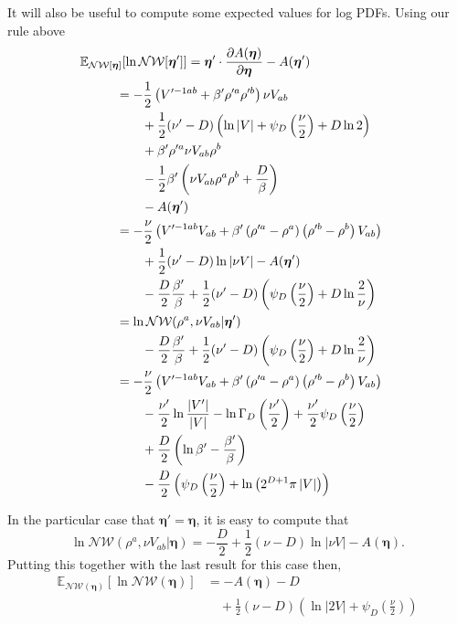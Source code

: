 \documentclass[aps,showpacs,twocolumn,prd,superscriptaddress,nofootinbib]{revtex4}
\newcommand{\be}{\begin{equation}}
\newcommand{\ee}{\end{equation}}
\newcommand{\nn}{\nonumber}
\newcommand{\E}[1]{{\mathbb E}_{#1}\!}
\begin{document}
It will also be useful to compute some expected values for log PDFs. Using our rule above
\begin{align}
  \E{\mathcal {NW}[\bm\eta]}\left[\ln\mathcal{NW}[\bm\eta']\right]
  \mkern-100mu &\mkern100mu =\bm\eta' \cdot \frac{\partial A(\bm\eta)}{\partial\bm\eta} -A({\bm\eta'})&\nn\\
  \qquad&=
  -\frac12\left(V'^{-1ab}+\beta'\rho'^a\rho'^b\right){\nu}V_{ab}\nn\\
  &\qquad+\frac12(\nu'-D)\left(\ln\left|V\right|+\psi_D\left(\frac\nu2\right)+D\ln2\right)\nn\\
  &\qquad+\beta'\rho'^a\nu V_{ab}\rho^b\nn\\
  &\qquad-\frac12\beta'\left(\nu V_{ab}\rho^a\rho^b+\frac D\beta\right)\nn\\
  &\qquad-A({\bm\eta'})\nn\\
  &=
  -\frac\nu2\left(V'^{-1ab}V_{ab}+\beta'\left(\rho'^a-\rho^a\right)\left(\rho'^b-\rho^b\right)V_{ab}\right)\nn\\
  &\qquad+\frac12(\nu'-D)\ln\left|\nu V\right|-A({\bm\eta'})\nn\\
  &\qquad-\frac D2\frac{\beta'}\beta+\frac12(\nu'-D)\left(\psi_D\left(\frac\nu2\right)+D\ln\frac2\nu\right)\nn\\
  &=\ln\mathcal {NW}(\rho^a,\nu V_{ab}|\bm\eta')\nn\\
  &\qquad-\frac D2\frac{\beta'}\beta+\frac12(\nu'-D)\left(\psi_D\left(\frac\nu2\right)+D\ln\frac2\nu\right)\label{eq:ElnNW-compact}\\
  &=
  -\frac\nu2\left(V'^{-1ab}V_{ab}+\beta'\left(\rho'^a-\rho^a\right)\left(\rho'^b-\rho^b\right)V_{ab}\right)\nn\\
  &\qquad-\frac{\nu'}2\ln\frac{|V'|}{|V|}-\ln\Gamma_D\left(\frac{\nu'}2\right)+\frac{\nu'}2\psi_D\left(\frac\nu2\right)\nn\\
  &\qquad+\frac D2\left(\ln\beta'-\frac{\beta'}\beta\right)\nn\\
  &\qquad- \frac D2\left(\psi_D\left(\frac\nu2\right)+\ln\left(2^{D+1}\pi\left|V\right|\right)\right)\label{eq:ElnNW-expanded}
\end{align}

In the particular case that $\bm\eta'=\bm\eta$, it is easy to compute that
\be
\ln\mathcal {NW}\left(\rho^a,\nu V_{ab}|\bm\eta\right)=-\frac D2+\frac12(\nu-D)\ln\left|\nu V\right|-A({\bm\eta}).\nn
\ee
Putting this together with the last result for this case then,
\begin{align}
  \E{\mathcal {NW}\left(\bm\eta\right)}\left[\ln\mathcal{NW}\left(\bm\eta\right)\right]
  &=
  -A({\bm\eta})-D\nn\\
  &\quad +\frac12(\nu-D)\left(\ln\left|2V\right|+\psi_D\left(\frac\nu2\right)\right)\label{eq:ElnNW}
\end{align}
\end{document}
